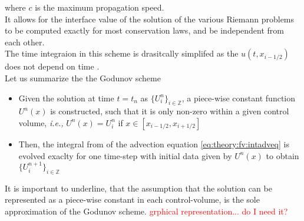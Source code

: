 \documentclass[11pt,a4paper,headinclude=true,DIV=14,BCOR=8mm,chapterprefix,listof=totoc,twoside,openright,abstracton]{scrbook}
\begin{document}
where $c$ is the maximum propagation speed. \\
It allows for the interface value of the solution of the various Riemann problems to be computed exactly for most conservation laws, and be independent from each other. \\

The time integraion in this scheme is drasitcally simplifed as the $u(t, x_{i-1/2})$ does not depend on time \cite{LeVeque:1992}. \\

Let us summarize the the Godunov scheme

\begin{itemize}
    \item Given the solution at time $t= t_n$ as $\{U_i ^n\}_{i\in\mathbb{Z}}$, a piece-wise constant function $U^n(x)$ is constructed, such that it is only non-zero within a given control volume, \textit{i.e.,} $U^n(x) = U_i ^n$ if $x\in[x_{i-1/2}, x_{i+1/2}]$
    \item Then, the integral from of the advection equation \ref{eq:theory:fv:intadveq} is evolved exaclty for one time-step with initial data given by $U^n(x)$ to obtain $\{U^{n+1}_i\}_{i\in\mathbb{Z}}$ 
\end{itemize}

It is important to underline, that the assumption that the solution can be represented as a piece-wise constant in each control-volume, is the sole approximation of the Godunov scheme. \textcolor{red}{grphical representation... do I need it?} \\
\end{document}
